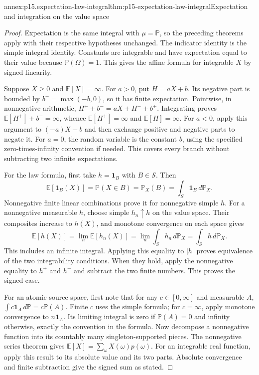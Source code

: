 \begin{annexitem}{annex:p15.expectation-law-integral}{thm:p15-expectation-law-integral}{Expectation and integration on the value space}
\begin{proof}
Expectation is the same integral with \(\mu=\mathbb P\), so
the preceding theorems apply with their respective hypotheses unchanged.
The indicator identity is the simple integral identity. Constants
are integrable and have expectation equal to their value because
\(\mathbb P(\Omega)=1\). This gives the affine formula for
integrable \(X\) by signed linearity.

Suppose \(X\geq0\) and \(\mathbb E[X]=\infty\). For \(a>0\),
put \(H=aX+b\). Its negative part is bounded by \(b^-=\max(-b,0)\),
so it has finite expectation. Pointwise, in nonnegative arithmetic,
\(H^++b^-=aX+H^-+b^+\). Integrating proves
\(\mathbb E[H^+]+b^-=\infty\), whence
\(\mathbb E[H^+]=\infty\) and \(\mathbb E[H]=\infty\).
For \(a<0\), apply this argument to \((-a)X-b\) and then
exchange positive and negative parts to negate it. For \(a=0\),
the random variable is the constant \(b\), using the specified
zero-times-infinity convention if needed. This covers every branch
without subtracting two infinite expectations.

For the law formula, first take \(h=\mathbf1_B\) with
\(B\in\mathcal S\). Then
\[
 \mathbb E[\mathbf1_B(X)]=\mathbb P(X\in B)
     =\mathbb P_X(B)=\int_S\mathbf1_B\,d\mathbb P_X.
\]
Nonnegative finite linear combinations prove it for nonnegative simple
\(h\). For a nonnegative measurable \(h\), choose simple
\(h_n\uparrow h\) on the value space. Their composites increase
to \(h(X)\), and monotone convergence on each space gives
\[
 \mathbb E[h(X)]=\lim_n\mathbb E[h_n(X)]
   =\lim_n\int_S h_n\,d\mathbb P_X=\int_S h\,d\mathbb P_X.
\]
This includes an infinite integral. Applying this equality to \(|h|\)
proves equivalence of the two integrability conditions. When they
hold, apply the nonnegative equality to \(h^+\) and \(h^-\)
and subtract the two finite numbers. This proves the signed case.

For an atomic source space, first note that for any \(c\in[0,\infty]\)
and measurable \(A\),
\(\int c\mathbf1_A\,d\mathbb P=c\mathbb P(A)\).
Finite \(c\) uses the simple formula; for \(c=\infty\),
apply monotone convergence to \(n\mathbf1_A\). Its limiting integral
is zero if \(\mathbb P(A)=0\) and infinity otherwise, exactly
the convention in the formula. Now decompose a nonnegative function
into its countably many singleton-supported pieces. The nonnegative
series theorem gives
\(\mathbb E[X]=\sum_\omega X(\omega)p(\omega)\).
For an integrable real function, apply this result to its absolute
value and its two parts. Absolute convergence and finite subtraction
give the signed sum as stated.
\end{proof}
\end{annexitem}

